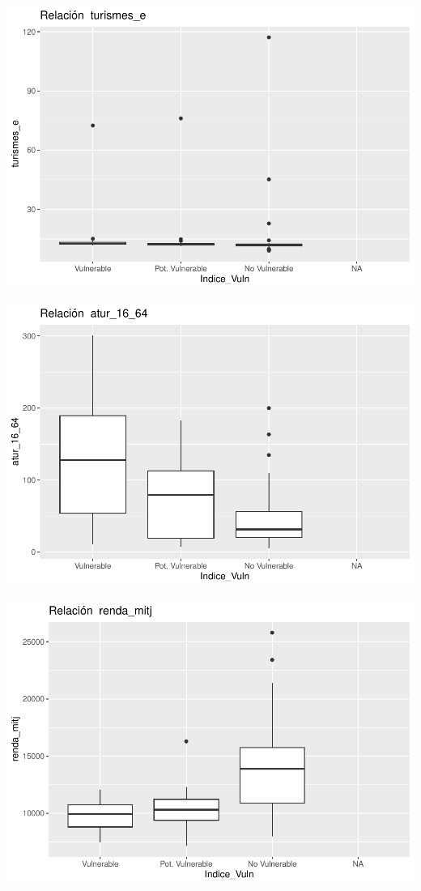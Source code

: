 \documentclass[notspecified,article,submit,moreauthors,pdftex]{Definitions/mdpi}
\begin{document}
\begin{center}\includegraphics{./figure/unnamed-chunk-23-2} \end{center}

\begin{center}\includegraphics{./figure/unnamed-chunk-23-3} \end{center}

\begin{center}\includegraphics{./figure/unnamed-chunk-23-4} \end{center}
\end{document}
